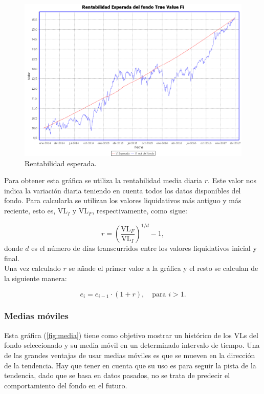\documentclass[12pt, a4paper]{book}
\begin{document}
	\begin{figure}[htbp]
	\centering
	\includegraphics[width=\textwidth]{figuras/esperada.PNG}
	\caption{Rentabilidad esperada.}
	\label{fig:esperada}
	\end {figure}

Para obtener esta gráfica se utiliza la rentabilidad media diaria $r$. Este valor nos indica la variación diaria teniendo en cuenta todos los datos disponibles del fondo. Para calcularla se utilizan los valores liquidativos más antiguo y más reciente, esto es, $\text{VL}_I$ y $\text{VL}_F$, respectivamente, como sigue:

\begin{equation}
r=\left(\frac{\text{VL}_F}{\text{VL}_I}\right)^{1/d}-1,
\end{equation} 
donde $d$ es el número de días transcurridos entre los valores liquidativos inicial y final.\\

Una vez calculado $r$ se añade el primer valor a la gráfica y el resto se calculan de la siguiente manera:

\begin{equation}
e_i= e_{i-1}\cdot \left(1 + r\right), \quad\text{para }i>1.
\end{equation} 



\newpage

\subsubsection{Medias móviles}

Esta gráfica (\ref{fig:media}) tiene como objetivo mostrar un histórico de los \gls{VL}s del fondo seleccionado y su media móvil en un determinado intervalo de tiempo. Una de las grandes ventajas de usar medias móviles es que se mueven en la dirección de la tendencia. Hay que tener en cuenta que su uso es para seguir la pista de la tendencia, dado que se basa en datos pasados, no se trata de predecir el comportamiento del fondo en el futuro.
\end{document}
